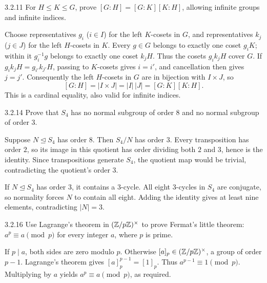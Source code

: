 \documentclass[11pt,oneside]{article}
\begin{document}
\begin{exercise}{3.2.11}
For $H\le K\le G$, prove $[G:H]=[G:K][K:H]$, allowing infinite groups and infinite indices.
\end{exercise}

\begin{solution}
Choose representatives $g_i$ ($i\in I$) for the left $K$-cosets in $G$, and representatives $k_j$ ($j\in J$) for the left $H$-cosets in $K$. Every $g\in G$ belongs to exactly one coset $g_iK$; within it $g_i^{-1}g$ belongs to exactly one coset $k_jH$. Thus the cosets $g_ik_jH$ cover $G$. If $g_ik_jH=g_{i'}k_{j'}H$, passing to $K$-cosets gives $i=i'$, and cancellation then gives $j=j'$. Consequently the left $H$-cosets in $G$ are in bijection with $I\times J$, so
\[
[G:H]=|I\times J|=|I|\,|J|=[G:K][K:H].
\]
This is a cardinal equality, also valid for infinite indices.
\end{solution}

\begin{exercise}{3.2.14}
Prove that $S_4$ has no normal subgroup of order $8$ and no normal subgroup of order $3$.
\end{exercise}

\begin{solution}
Suppose $N\trianglelefteq S_4$ has order $8$. Then $S_4/N$ has order $3$. Every transposition has order $2$, so its image in this quotient has order dividing both $2$ and $3$, hence is the identity. Since transpositions generate $S_4$, the quotient map would be trivial, contradicting the quotient's order $3$.

If $N\trianglelefteq S_4$ has order $3$, it contains a $3$-cycle. All eight $3$-cycles in $S_4$ are conjugate, so normality forces $N$ to contain all eight. Adding the identity gives at least nine elements, contradicting $|N|=3$.
\end{solution}

\begin{exercise}{3.2.16}
Use Lagrange's theorem in $(\mathbb{Z}/p\mathbb{Z})^\times$ to prove Fermat's little theorem: $a^p\equiv a\pmod p$ for every integer $a$, where $p$ is prime.
\end{exercise}

\begin{solution}
If $p\mid a$, both sides are zero modulo $p$. Otherwise $[a]_p\in(\mathbb{Z}/p\mathbb{Z})^\times$, a group of order $p-1$. Lagrange's theorem gives $[a]_p^{p-1}=[1]_p$. Thus $a^{p-1}\equiv1\pmod p$. Multiplying by $a$ yields $a^p\equiv a\pmod p$, as required.
\end{solution}
\end{document}
